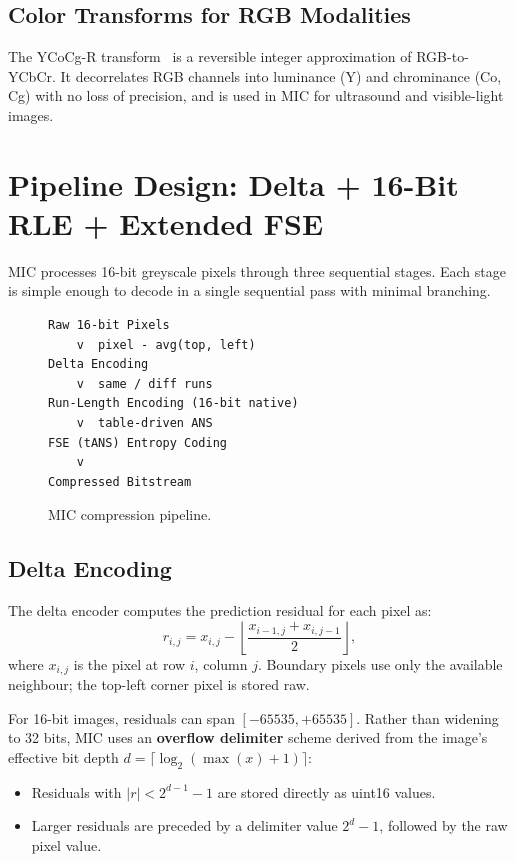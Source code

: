 \documentclass[10pt,twocolumn]{article}
\begin{document}
\subsection{Color Transforms for RGB Modalities}

The YCoCg-R transform~\cite{ycocgr} is a reversible integer approximation of
RGB-to-YCbCr. It decorrelates RGB channels into luminance (Y) and chrominance
(Co, Cg) with no loss of precision, and is used in MIC for ultrasound and
visible-light images.

\section{Pipeline Design: Delta + 16-Bit RLE + Extended FSE}
\label{sec:pipeline}

MIC processes 16-bit greyscale pixels through three sequential stages. Each
stage is simple enough to decode in a single sequential pass with minimal
branching.

\begin{figure}[htbp]
\centering
\begin{lstlisting}
Raw 16-bit Pixels
    v  pixel - avg(top, left)
Delta Encoding
    v  same / diff runs
Run-Length Encoding (16-bit native)
    v  table-driven ANS
FSE (tANS) Entropy Coding
    v
Compressed Bitstream
\end{lstlisting}
\caption{MIC compression pipeline.}
\label{fig:pipeline}
\end{figure}

\subsection{Delta Encoding}

The delta encoder computes the prediction residual for each pixel as:
\begin{equation}
  r_{i,j} = x_{i,j} - \left\lfloor \frac{x_{i-1,j} + x_{i,j-1}}{2}
  \right\rfloor,
\end{equation}
where $x_{i,j}$ is the pixel at row $i$, column $j$. Boundary pixels use only
the available neighbour; the top-left corner pixel is stored raw.

For 16-bit images, residuals can span $[-65535, +65535]$. Rather than widening
to 32 bits, MIC uses an \textbf{overflow delimiter} scheme derived from the
image's effective bit depth $d = \lceil\log_2(\max(x)+1)\rceil$:
\begin{itemize}
  \item Residuals with $|r| < 2^{d-1}-1$ are stored directly as uint16 values.
  \item Larger residuals are preceded by a delimiter value $2^d - 1$, followed
  by the raw pixel value.
\end{itemize}
\end{document}
